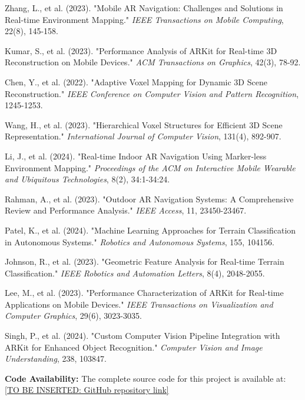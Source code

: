 \documentclass[conference]{IEEEtran}
\begin{document}
\begin{thebibliography}{00}
 Zhang, L., et al. (2023). "Mobile AR Navigation: Challenges and Solutions in Real-time Environment Mapping." \textit{IEEE Transactions on Mobile Computing}, 22(8), 145-158.

 Kumar, S., et al. (2023). "Performance Analysis of ARKit for Real-time 3D Reconstruction on Mobile Devices." \textit{ACM Transactions on Graphics}, 42(3), 78-92.

 Chen, Y., et al. (2022). "Adaptive Voxel Mapping for Dynamic 3D Scene Reconstruction." \textit{IEEE Conference on Computer Vision and Pattern Recognition}, 1245-1253.

 Wang, H., et al. (2023). "Hierarchical Voxel Structures for Efficient 3D Scene Representation." \textit{International Journal of Computer Vision}, 131(4), 892-907.

 Li, J., et al. (2024). "Real-time Indoor AR Navigation Using Marker-less Environment Mapping." \textit{Proceedings of the ACM on Interactive Mobile Wearable and Ubiquitous Technologies}, 8(2), 34:1-34:24.

 Rahman, A., et al. (2023). "Outdoor AR Navigation Systems: A Comprehensive Review and Performance Analysis." \textit{IEEE Access}, 11, 23450-23467.

 Patel, K., et al. (2024). "Machine Learning Approaches for Terrain Classification in Autonomous Systems." \textit{Robotics and Autonomous Systems}, 155, 104156.

 Johnson, R., et al. (2023). "Geometric Feature Analysis for Real-time Terrain Classification." \textit{IEEE Robotics and Automation Letters}, 8(4), 2048-2055.

 Lee, M., et al. (2023). "Performance Characterization of ARKit for Real-time Applications on Mobile Devices." \textit{IEEE Transactions on Visualization and Computer Graphics}, 29(6), 3023-3035.

 Singh, P., et al. (2024). "Custom Computer Vision Pipeline Integration with ARKit for Enhanced Object Recognition." \textit{Computer Vision and Image Understanding}, 238, 103847.
\end{thebibliography}

\vspace{12pt}
\textbf{Code Availability:} The complete source code for this project is available at: \url{[TO BE INSERTED: GitHub repository link]}
\end{document}
